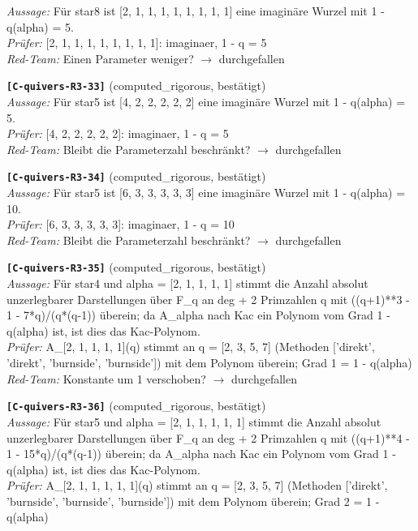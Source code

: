 \documentclass[11pt]{article}
\theoremstyle{definition}\newtheorem{definition}[theorem]{Definition}\newtheorem{remark}[theorem]{Remark}\newtheorem{observation}[theorem]{Numerical observation}
\begin{document}
\textit{Aussage:} Für star8 ist [2, 1, 1, 1, 1, 1, 1, 1, 1] eine imaginäre Wurzel mit 1 - q(alpha) = 5.\\
\textit{Prüfer:} [2, 1, 1, 1, 1, 1, 1, 1, 1]: imaginaer, 1 - q = 5\\
\textit{Red-Team:} Einen Parameter weniger? $\to$ durchgefallen\par\medskip
\noindent\textbf{\texttt{[C-quivers-R3-33]}} (computed\_rigorous, bestätigt)\\
\textit{Aussage:} Für star5 ist [4, 2, 2, 2, 2, 2] eine imaginäre Wurzel mit 1 - q(alpha) = 5.\\
\textit{Prüfer:} [4, 2, 2, 2, 2, 2]: imaginaer, 1 - q = 5\\
\textit{Red-Team:} Bleibt die Parameterzahl beschränkt? $\to$ durchgefallen\par\medskip
\noindent\textbf{\texttt{[C-quivers-R3-34]}} (computed\_rigorous, bestätigt)\\
\textit{Aussage:} Für star5 ist [6, 3, 3, 3, 3, 3] eine imaginäre Wurzel mit 1 - q(alpha) = 10.\\
\textit{Prüfer:} [6, 3, 3, 3, 3, 3]: imaginaer, 1 - q = 10\\
\textit{Red-Team:} Bleibt die Parameterzahl beschränkt? $\to$ durchgefallen\par\medskip
\noindent\textbf{\texttt{[C-quivers-R3-35]}} (computed\_rigorous, bestätigt)\\
\textit{Aussage:} Für star4 und alpha = [2, 1, 1, 1, 1] stimmt die Anzahl absolut unzerlegbarer Darstellungen über F\_q an deg + 2 Primzahlen q mit ((q+1)**3 - 1 - 7*q)/(q*(q-1)) überein; da A\_alpha nach Kac ein Polynom vom Grad 1 - q(alpha) ist, ist dies das Kac-Polynom.\\
\textit{Prüfer:} A\_[2, 1, 1, 1, 1](q) stimmt an q = [2, 3, 5, 7] (Methoden ['direkt', 'direkt', 'burnside', 'burnside']) mit dem Polynom überein; Grad 1 = 1 - q(alpha)\\
\textit{Red-Team:} Konstante um 1 verschoben? $\to$ durchgefallen\par\medskip
\noindent\textbf{\texttt{[C-quivers-R3-36]}} (computed\_rigorous, bestätigt)\\
\textit{Aussage:} Für star5 und alpha = [2, 1, 1, 1, 1, 1] stimmt die Anzahl absolut unzerlegbarer Darstellungen über F\_q an deg + 2 Primzahlen q mit ((q+1)**4 - 1 - 15*q)/(q*(q-1)) überein; da A\_alpha nach Kac ein Polynom vom Grad 1 - q(alpha) ist, ist dies das Kac-Polynom.\\
\textit{Prüfer:} A\_[2, 1, 1, 1, 1, 1](q) stimmt an q = [2, 3, 5, 7] (Methoden ['direkt', 'burnside', 'burnside', 'burnside']) mit dem Polynom überein; Grad 2 = 1 - q(alpha)\\
\end{document}

